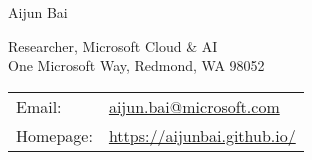 \documentclass[letterpaper,10pt]{article}
\def\name{Aijun Bai}
\begin{document}
\begin{flushleft}
	{\huge \name}
\end{flushleft}

\bigskip

\begin{minipage}{0.5\textwidth}
	Researcher, Microsoft Cloud \& AI \\
	One Microsoft Way, Redmond, WA 98052
\end{minipage}
\begin{minipage}{0.5\textwidth}
	\begin{tabular}{ll}
		Email:    & \href{mailto:aijun.bai@microsoft.com}{\rm aijun.bai@microsoft.com} \\
		Homepage: & \url{https://aijunbai.github.io/} \\
	\end{tabular}
\end{minipage}

\vspace{15pt}
\end{document}
